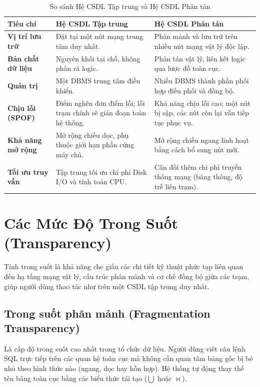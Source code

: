 \documentclass[12pt,a4paper]{report}
\begin{document}
\begin{table}[h!]
\centering
\caption{So sánh Hệ CSDL Tập trung và Hệ CSDL Phân tán}
\label{tab:so_sanh_tap_trung_phan_tan}
\renewcommand{\arraystretch}{1.25}
\begin{tabularx}{\textwidth}{|>{\raggedright\arraybackslash}p{2.6cm}|>{\raggedright\arraybackslash}X|>{\raggedright\arraybackslash}X|}
\hline
\textbf{Tiêu chí} & \textbf{Hệ CSDL Tập trung} & \textbf{Hệ CSDL Phân tán} \\ \hline
\textbf{Vị trí lưu trữ} & Đặt tại một nút mạng trung tâm duy nhất. & Phân mảnh và lưu trữ trên nhiều nút mạng vật lý độc lập. \\ \hline
\textbf{Bản chất dữ liệu} & Nguyên khối tại chỗ, không phân rã logic. & Phân tán vật lý, liên kết logic qua lược đồ toàn cục. \\ \hline
\textbf{Quản trị} & Một DBMS trung tâm điều khiển. & Nhiều DBMS thành phần phối hợp điều phối và đồng bộ. \\ \hline
\textbf{Chịu lỗi (SPOF)} & Điểm nghẽn đơn điểm lỗi; lỗi trạm chính sẽ gián đoạn toàn hệ thống. & Khả năng chịu lỗi cao; một nút bị sập, các nút còn lại vẫn tiếp tục phục vụ. \\ \hline
\textbf{Khả năng mở rộng} & Mở rộng chiều dọc, phụ thuộc giới hạn phần cứng máy chủ. & Mở rộng chiều ngang linh hoạt bằng cách bổ sung nút mới. \\ \hline
\textbf{Tối ưu truy vấn} & Tập trung tối ưu chi phí Disk I/O và tính toán CPU. & Cân đối thêm chi phí truyền thông mạng (băng thông, độ trễ liên trạm). \\ \hline
\end{tabularx}
\end{table}

\section{Các Mức Độ Trong Suốt (Transparency)}
Tính trong suốt là khả năng che giấu các chi tiết kỹ thuật phức tạp liên quan đến hạ tầng mạng vật lý, cấu trúc phân mảnh và cơ chế đồng bộ giữa các trạm, giúp người dùng thao tác như trên một CSDL tập trung duy nhất.

\subsection{Trong suốt phân mảnh (Fragmentation Transparency)}
Là cấp độ trong suốt cao nhất trong tổ chức dữ liệu. Người dùng viết câu lệnh SQL trực tiếp trên các quan hệ toàn cục mà không cần quan tâm bảng gốc bị bẻ nhỏ theo hình thức nào (ngang, dọc hay hỗn hợp). Hệ thống tự động thay thế tên bảng toàn cục bằng các biểu thức tái tạo ($\bigcup$ hoặc $\bowtie$).
\end{document}
